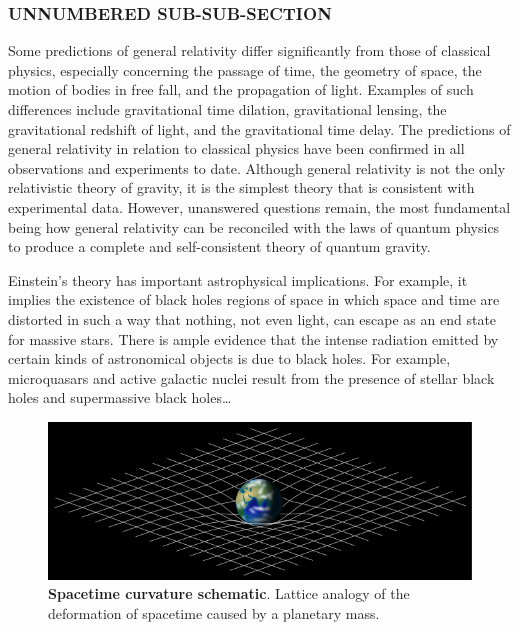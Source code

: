 \subsubsection*{UNNUMBERED SUB-SUB-SECTION}
Some predictions of general relativity differ significantly from those of
classical physics, especially concerning the passage of time, the geometry of
space, the motion of bodies in free fall, and the propagation of light. Examples
of such differences include gravitational time dilation, gravitational lensing,
the gravitational redshift of light, and the gravitational time delay. The
predictions of general relativity in relation to classical physics have been
confirmed in all observations and experiments to date. Although general
relativity is not the only relativistic theory of gravity, it is the simplest
theory that is consistent with experimental data. However, unanswered questions
remain, the most fundamental being how general relativity can be reconciled with
the laws of quantum physics to produce a complete and self-consistent theory of
quantum gravity.

Einstein's theory has important astrophysical implications. For example, it
implies the existence of black holes regions of space in which space and time
are distorted in such a way that nothing, not even light, can escape as an
end state for massive stars. There is ample evidence that the intense radiation
emitted by certain kinds of astronomical objects is due to black holes. For
example, microquasars and active galactic nuclei result from the presence of
stellar black holes and supermassive black holes\ldots


\vfill\null

\begin{figure}[b]
\begin{center}
\includegraphics[width=.47\textwidth]{img/image1.png}
\caption{\textbf{Spacetime curvature schematic}. Lattice analogy of the deformation
of spacetime caused by a planetary mass.}
\label{gr01}
\end{center}
\end{figure}

\newpage %
